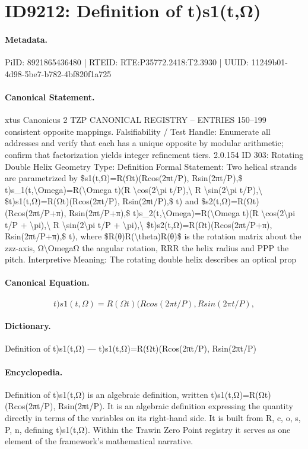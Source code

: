 \section*{ID9212: Definition of t)s1(t,Ω)}
\paragraph{Metadata.}
PiID: 8921865436480 | RTEID: RTE:P35772.2418:T2.3930 | UUID: 11249b01-4d98-5be7-b782-4bf820f1a725

\paragraph{Canonical Statement.}
xtus Canonicus 2 TZP CANONICAL REGISTRY – ENTRIES 150–199 consistent opposite mappings. Falsifiability / Test Handle: Enumerate all addresses and verify that each has a unique opposite by modular arithmetic; confirm that factorization yields integer refinement tiers. 2.0.154 ID 303: Rotating Double Helix Geometry Type: Definition Formal Statement: Two helical strands are parametrized by \$s1(t,Ω)=R(Ωt)(Rcos(2πt/P), Rsin(2πt/P),\$ t)s\_1(t,\textbackslash{}Omega)=R(\textbackslash{}Omega t)(R \textbackslash{}cos(2\textbackslash{}pi t/P),\textbackslash{} R \textbackslash{}sin(2\textbackslash{}pi t/P),\textbackslash{} \$t)s1(t,Ω)=R(Ωt)(Rcos(2πt/P), Rsin(2πt/P),\$ t) and \$s2(t,Ω)=R(Ωt)(Rcos(2πt/P+π), Rsin(2πt/P+π),\$ t)s\_2(t,\textbackslash{}Omega)=R(\textbackslash{}Omega t)(R \textbackslash{}cos(2\textbackslash{}pi t/P + \textbackslash{}pi),\textbackslash{} R \textbackslash{}sin(2\textbackslash{}pi t/P + \textbackslash{}pi),\textbackslash{} \$t)s2(t,Ω)=R(Ωt)(Rcos(2πt/P+π), Rsin(2πt/P+π),\$ t), where \$R(θ)R(\textbackslash{}theta)R(θ)\$ is the rotation matrix about the zzz-axis, Ω\textbackslash{}OmegaΩ the angular rotation, RRR the helix radius and PPP the pitch. Interpretive Meaning: The rotating double helix describes an optical prop

\paragraph{Canonical Equation.}
\[
t)s1(t,Ω)=R(Ωt)(Rcos(2πt/P), Rsin(2πt/P),
\]

\paragraph{Dictionary.}
Definition of t)s1(t,Ω) — t)s1(t,Ω)=R(Ωt)(Rcos(2πt/P), Rsin(2πt/P)

\paragraph{Encyclopedia.}
Definition of t)s1(t,Ω) is an algebraic definition, written t)s1(t,Ω)=R(Ωt)(Rcos(2πt/P), Rsin(2πt/P). It is an algebraic definition expressing the quantity directly in terms of the variables on its right-hand side. It is built from R, c, o, s, P, n, defining t)s1(t,Ω). Within the Trawin Zero Point registry it serves as one element of the framework's mathematical narrative.
